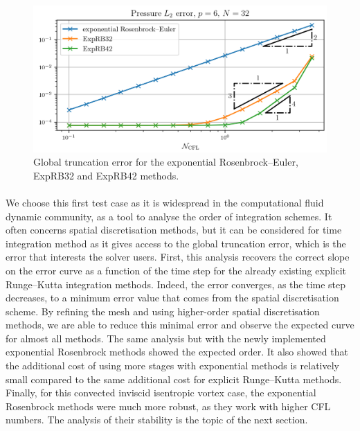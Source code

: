       \begin{figure}
        \centering
        \includegraphics{figures/covo_exp.png}
        \caption{Global truncation error for the exponential Rosenbrock--Euler, ExpRB32 and ExpRB42 methods.}
        \label{fig:covo_exp}
      \end{figure}

      \paragraph{}
      We choose this first test case as it is widespread in the computational fluid dynamic community, as a tool to analyse the order of integration schemes.
      It often concerns spatial discretisation methods, but it can be considered for time integration method as it gives access to the global truncation error, which is the error that interests the solver users.
      First, this analysis recovers the correct slope on the error curve as a function of the time step for the already existing explicit Runge--Kutta integration methods.
      Indeed, the error converges, as the time step decreases, to a minimum error value that comes from the spatial discretisation scheme.
      By refining the mesh and using higher-order spatial discretisation methods, we are able to reduce this minimal error and observe the expected curve for almost all methods.
      The same analysis but with the newly implemented exponential Rosenbrock methods showed the expected order.
      It also showed that the additional cost of using more stages with exponential methods is relatively small compared to the same additional cost for explicit Runge--Kutta methods.
      Finally, for this convected inviscid isentropic vortex case, the exponential Rosenbrock methods were much more robust, as they work with higher CFL numbers.
      The analysis of their stability is the topic of the next section.


